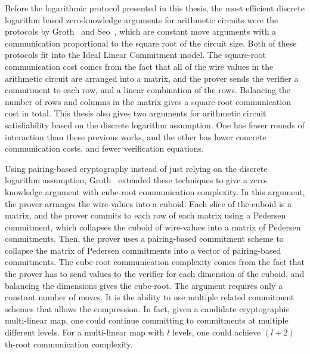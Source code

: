 Before the logarithmic protocol presented in this thesis, the most efficient discrete logarithm based zero-knowledge arguments for arithmetic circuits were the protocols by Groth~\cite{Groth2009b} and Seo~\cite{Seo2011a}, which are constant move arguments with a communication proportional to the square root of the circuit size. Both of these protocols fit into the Ideal Linear Commitment model. The square-root communication cost comes from the fact that all of the wire values in the arithmetic circuit are arranged into a matrix, and the prover sends the verifier a commitment to each row, and a linear combination of the rows. Balancing the number of rows and columns in the matrix gives a square-root communication cost in total. This thesis also gives two arguments for arithmetic circuit satisfiability based on the discrete logarithm assumption. One has fewer rounds of interaction than these previous works, and the other has lower concrete communication costs, and fewer verification equations.

Using pairing-based cryptography instead of just relying on the discrete logarithm assumption, Groth~\cite{Groth11} extended these techniques to give a zero-knowledge argument with cube-root communication complexity. In this argument, the prover arranges the wire-values into a cuboid. Each slice of the cuboid is a matrix, and the prover commits to each row of each matrix using a Pedersen commitment, which collapses the cuboid of wire-values into a matrix of Pedersen commitments. Then, the prover uses a pairing-based commitment scheme to collapse the matrix of Pedersen commitments into a vector of pairing-based commitments. The cube-root communication complexity comes from the fact that the prover has to send values to the verifier for each dimension of the cuboid, and balancing the dimensions gives the cube-root. The argument requires only a constant number of moves. It is the ability to use multiple related commitment schemes that allows the compression. In fact, given a candidate cryptographic multi-linear map, one could continue committing to commitments at multiple different levels. For a multi-linear map with $l$ levels, one could achieve $(l+2)$th-root communication complexity.

